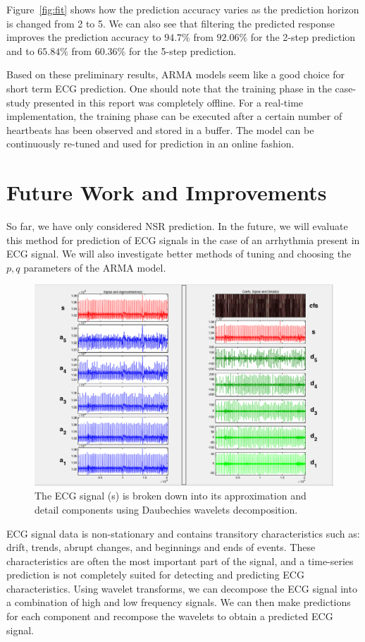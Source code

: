 \documentclass[letter, 10pt, journal]{elsarticle}
\theoremstyle{definition}
\begin{document}
Figure~\ref{fig:fit} shows how the prediction accuracy varies as the prediction horizon is changed from 2 to 5. We can also see that filtering the predicted response improves the prediction accuracy to $94.7\%$ from $92.06\%$ for the 2-step prediction and to $65.84\%$ from $60.36\%$ for the 5-step prediction.

Based on these preliminary results, ARMA models seem like a good choice for short term ECG prediction.
One should note that the training phase in the case-study presented in this report was completely offline. 
For a real-time implementation, the training phase can be executed after a certain number of heartbeats has been observed and stored in a buffer. The model can be continuously re-tuned and used for prediction in an online fashion.

\section{Future Work and Improvements}
So far, we have only considered NSR prediction. In the future, we will evaluate this method for prediction of ECG signals in the case of an arrhythmia present in ECG signal.
We will also investigate better methods of tuning and choosing the $p,q$ parameters of the ARMA model.
\begin{figure}
\centering
\includegraphics[width=\textwidth]{wavelet.png}
\caption{The ECG signal (s) is broken down into its approximation and detail components using Daubechies wavelets decomposition.}
\label{fig:wave}
\end{figure}

ECG signal data is non-stationary and contains transitory characteristics such as: drift, trends, abrupt changes, and beginnings and ends of events. 
These characteristics are often the most important part of the signal, and a time-series prediction is not completely suited for detecting and predicting ECG characteristics.
Using wavelet transforms, we can decompose the ECG signal into a combination of high and low frequency signals. We can then make predictions for each component and recompose the wavelets to obtain a predicted ECG signal.
\end{document}
